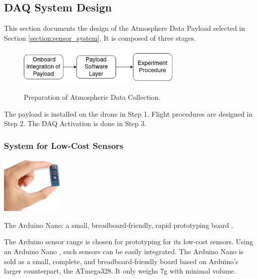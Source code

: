 \subsection{DAQ System Design}  

This section documents the design of the Atmosphere Data Payload selected in Section \ref{section:sensor_system}. It is composed of three stages.
            
\begin{figure}[!h]
    \raggedright
    \hspace{1.7cm}
    {\includegraphics[width=8cm]{images/stage_system/drone_setup/payload_onboard.png}}
    
    \caption{Preparation of Atmospheric Data Collection.}
    \label{fig:prep_atmospheric}
\end{figure}

The payload is installed on the drone in Step 1. Flight procedures are designed in Step 2. The DAQ Activation is done in Step 3.

\subsubsection{System for Low-Cost Sensors}\label{section:msp_daq}
\begin{marginfigure}%
  \hspace{0.5cm}
  \includegraphics[width=3cm]{images/stage_system/nano_pic.jpg}
  \caption{ The Arduino Nano: a small, breadboard-friendly, rapid prototyping board \cite{arduino_docs}.}
\end{marginfigure}
            
        The Arduino sensor range is chosen for prototyping for its low-cost sensors. Using an Arduino Nano \cite{arduino_docs}, such sensors can be easily integrated. The Arduino Nano is sold as a small, complete, and breadboard-friendly board based on Arduino's larger counterpart, the ATmega328. It only weighs 7g with minimal volume.

